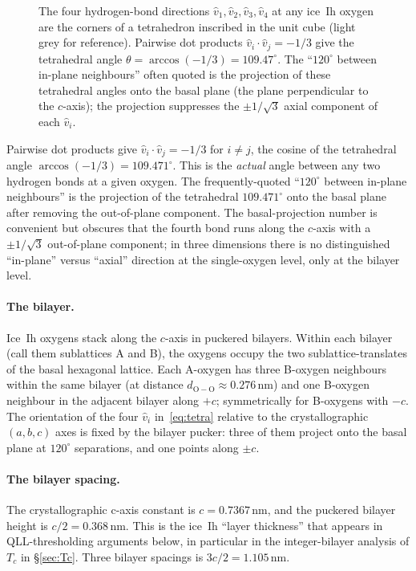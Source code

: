 \documentclass[final]{siamltex}
\begin{document}
\begin{figure}[h]
\begin{tikzpicture}
\end{tikzpicture}
\caption{The four hydrogen-bond directions $\hat{v}_1, \hat{v}_2,
\hat{v}_3, \hat{v}_4$ at any ice~Ih oxygen are the corners of a
tetrahedron inscribed in the unit cube (light grey for reference).
Pairwise dot products $\hat{v}_i \cdot \hat{v}_j = -1/3$ give the
tetrahedral angle $\theta = \arccos(-1/3) = 109.47^{\circ}$.  The
``$120^{\circ}$ between in-plane neighbours'' often quoted is the
projection of these tetrahedral angles onto the basal plane (the
plane perpendicular to the $c$-axis); the projection suppresses
the $\pm 1/\sqrt{3}$ axial component of each $\hat{v}_i$.}
\label{fig:tetra}
\end{figure}
Pairwise dot products give
$\hat{v}_i \cdot \hat{v}_j = -1/3$ for $i \ne j$, the cosine of the
tetrahedral angle $\arccos(-1/3) = 109.471^{\circ}$.  This is the
\emph{actual} angle between any two hydrogen bonds at a given
oxygen.  The frequently-quoted ``$120^{\circ}$ between in-plane
neighbours'' is the projection of the tetrahedral $109.471^{\circ}$
onto the basal plane after removing the out-of-plane component.
The basal-projection number is convenient but obscures that the
fourth bond runs along the $c$-axis with a $\pm 1/\sqrt{3}$
out-of-plane component; in three dimensions there is no
distinguished ``in-plane'' versus ``axial'' direction at the
single-oxygen level, only at the bilayer level.

\paragraph{The bilayer.}  Ice~Ih oxygens stack along the $c$-axis
in puckered bilayers.  Within each bilayer (call them sublattices
A and B), the oxygens occupy the two sublattice-translates of the
basal hexagonal lattice.  Each A-oxygen has three B-oxygen
neighbours within the same bilayer (at distance
$d_{\mathrm{O\!-\!O}} \approx 0.276$\,nm) and one B-oxygen
neighbour in the adjacent bilayer along $+c$; symmetrically for
B-oxygens with $-c$.  The orientation of the four
$\hat{v}_i$ in~\eqref{eq:tetra} relative to the crystallographic
$(a, b, c)$ axes is fixed by the bilayer pucker: three of them
project onto the basal plane at $120^{\circ}$ separations, and
one points along $\pm c$.

\paragraph{The bilayer spacing.}  The crystallographic c-axis
constant is $c = 0.7367$\,nm, and the puckered bilayer height is
$c/2 = 0.368$\,nm.  This is the ice~Ih ``layer thickness'' that
appears in QLL-thresholding arguments below, in particular in the
integer-bilayer analysis of $T_c$ in
\S\ref{sec:Tc}.  Three bilayer spacings is $3c/2 = 1.105$\,nm.
\end{document}
